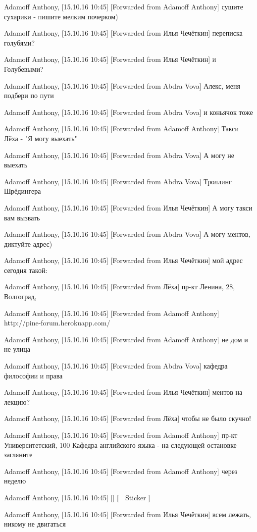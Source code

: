 Adamoff Anthony, [15.10.16 10:45]
[Forwarded from Adamoff Anthony]
сушите сухарики - пишите мелким почерком)

Adamoff Anthony, [15.10.16 10:45]
[Forwarded from Илья Чечёткин]
переписка голубями?

Adamoff Anthony, [15.10.16 10:45]
[Forwarded from Илья Чечёткин]
и Голубевыми?

Adamoff Anthony, [15.10.16 10:45]
[Forwarded from Abdra Vova]
Алекс, меня подбери по пути

Adamoff Anthony, [15.10.16 10:45]
[Forwarded from Abdra Vova]
и коньячок тоже

Adamoff Anthony, [15.10.16 10:45]
[Forwarded from Adamoff Anthony]
Такси Лёха - "Я могу выехать"

Adamoff Anthony, [15.10.16 10:45]
[Forwarded from Abdra Vova]
А могу не выехать

Adamoff Anthony, [15.10.16 10:45]
[Forwarded from Abdra Vova]
Троллинг Шрёдингера

Adamoff Anthony, [15.10.16 10:45]
[Forwarded from Илья Чечёткин]
А могу такси вам вызвать

Adamoff Anthony, [15.10.16 10:45]
[Forwarded from Abdra Vova]
А могу ментов, диктуйте адрес)

Adamoff Anthony, [15.10.16 10:45]
[Forwarded from Илья Чечёткин]
мой адрес сегодня такой:

Adamoff Anthony, [15.10.16 10:45]
[Forwarded from Лёха]
пр-кт Ленина, 28, Волгоград,

Adamoff Anthony, [15.10.16 10:45]
[Forwarded from Adamoff Anthony]
http://pine-forum.herokuapp.com/

Adamoff Anthony, [15.10.16 10:45]
[Forwarded from Adamoff Anthony]
не дом и не улица

Adamoff Anthony, [15.10.16 10:45]
[Forwarded from Abdra Vova]
кафедра философии и права

Adamoff Anthony, [15.10.16 10:45]
[Forwarded from Илья Чечёткин]
ментов на лекцию?

Adamoff Anthony, [15.10.16 10:45]
[Forwarded from Лёха]
чтобы не было скучно!

Adamoff Anthony, [15.10.16 10:45]
[Forwarded from Adamoff Anthony]
пр-кт Университетский, 100 Кафедра английского языка - на следующей остановке загляните

Adamoff Anthony, [15.10.16 10:45]
[Forwarded from Adamoff Anthony]
через неделю

Adamoff Anthony, [15.10.16 10:45]
[]
[ 🔫 Sticker ]

Adamoff Anthony, [15.10.16 10:45]
[Forwarded from Илья Чечёткин]
всем лежать, никому не двигаться

